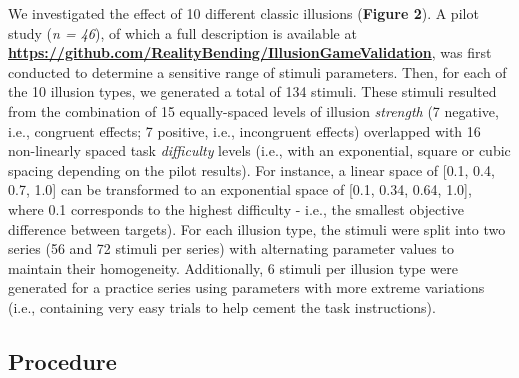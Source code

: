 \documentclass[
  man,floatsintext]{apa6}
\begin{document}
We investigated the effect of 10 different classic illusions (\textbf{Figure 2}).
A pilot study (\emph{n = 46}), of which a full description is available at \href{https://github.com/RealityBending/IllusionGameValidation}{\textbf{https://github.com/RealityBending/IllusionGameValidation}}, was first conducted to determine a sensitive range of stimuli parameters. Then, for each of the 10 illusion types, we generated a total of 134 stimuli. These stimuli resulted from the combination of 15 equally-spaced levels of illusion \emph{strength} (7 negative, i.e., congruent effects; 7 positive, i.e., incongruent effects) overlapped with 16 non-linearly spaced task \emph{difficulty} levels (i.e., with an exponential, square or cubic spacing depending on the pilot results). For instance, a linear space of {[}0.1, 0.4, 0.7, 1.0{]} can be transformed to an exponential space of {[}0.1, 0.34, 0.64, 1.0{]}, where 0.1 corresponds to the highest difficulty - i.e., the smallest objective difference between targets). For each illusion type, the stimuli were split into two series (56 and 72 stimuli per series) with alternating parameter values to maintain their homogeneity. Additionally, 6 stimuli per illusion type were generated for a practice series using parameters with more extreme variations (i.e., containing very easy trials to help cement the task instructions).

\hypertarget{procedure}{%
\subsection{Procedure}\label{procedure}}
\end{document}
